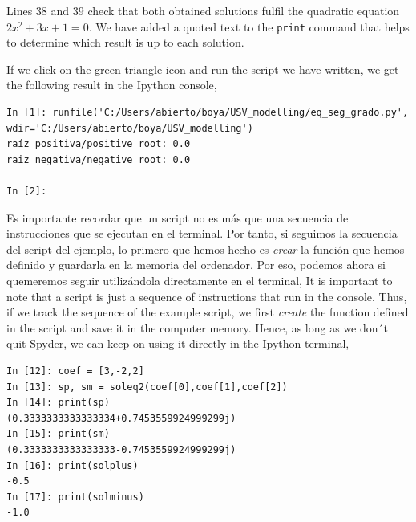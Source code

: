 \begin{paracol}{2}
     Lines $38$ and $39$ check that both obtained solutions fulfil the quadratic equation $2x^2+3x+1 = 0$. We have added a quoted text to the \texttt{print} command that helps to determine which result is up to each solution.

     If we click on the green triangle icon and run the script we have written, we get the following result in the Ipython console,
     
\end{paracol}

\begin{verbatim}
In [1]: runfile('C:/Users/abierto/boya/USV_modelling/eq_seg_grado.py',
wdir='C:/Users/abierto/boya/USV_modelling')
raíz positiva/positive root: 0.0
raiz negativa/negative root: 0.0

In [2]:    
\end{verbatim}

\begin{paracol}{2}
Es importante recordar que un script no es más que una secuencia de instrucciones que se ejecutan en el terminal. Por tanto, si seguimos la secuencia del script del ejemplo, lo primero que hemos hecho es \emph{crear} la función que hemos definido y guardarla en la memoria del ordenador. Por eso, podemos ahora si quemeremos seguir utilizándola directamente en el terminal,
\switchcolumn
It is important to note that a script is just a sequence of instructions that run in the console. Thus, if we track the sequence of the example script, we first \emph{create} the function defined in the script and save it in the computer memory. Hence, as long as we don´t quit Spyder,  we can keep on using it directly in the Ipython terminal,  
\end{paracol}

\begin{verbatim}
In [12]: coef = [3,-2,2]
In [13]: sp, sm = soleq2(coef[0],coef[1],coef[2])
In [14]: print(sp)
(0.3333333333333334+0.7453559924999299j)
In [15]: print(sm)
(0.3333333333333333-0.7453559924999299j)
In [16]: print(solplus)
-0.5
In [17]: print(solminus)
-1.0   
\end{verbatim}

